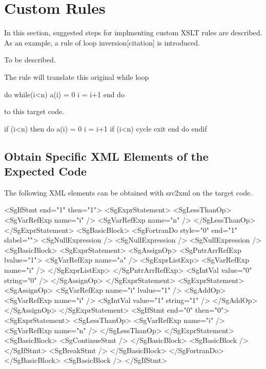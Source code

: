 \section{Custom Rules}\label{sec:custom}

In this section, suggested steps for implmenting custom XSLT rules are described.
As an example, a rule of loop inversion[citation] is introduced.

To be described.

\iffalse

The rule will translate this original while loop
\begin{framed}
\begin{src}
    do while(i<n)
        a(i) = 0
        i = i+1
    end do
\end{src}
\end{framed}

to this target code.

\begin{framed}
\begin{src}
    if (i<n) then
        do
            a(i) = 0
            i = i+1
            if  (i<n)  cycle
            exit
        end do
    endif
\end{src}
\end{framed}



\subsection{Obtain Specific XML Elements of the Expected Code}

The following XML elements can be obtained with src2xml on the target code.

\begin{framed}
\begin{src}
<SgIfStmt end="1" then="1">
	<SgExprStatement>
		<SgLessThanOp>
			<SgVarRefExp name="i" />
			<SgVarRefExp name="n" />
		</SgLessThanOp>
	</SgExprStatement>
	<SgBasicBlock>
		<SgFortranDo style="0" end="1" slabel="">
			<SgNullExpression />
			<SgNullExpression />
			<SgNullExpression />
			<SgBasicBlock>
				<SgExprStatement>
					<SgAssignOp>
						<SgPntrArrRefExp lvalue="1">
							<SgVarRefExp name="a" />
							<SgExprListExp>
								<SgVarRefExp name="i" />
							</SgExprListExp>
						</SgPntrArrRefExp>
						<SgIntVal value="0" string="0" />
					</SgAssignOp>
				</SgExprStatement>
				<SgExprStatement>
					<SgAssignOp>
						<SgVarRefExp name="i" lvalue="1" />
						<SgAddOp>
							<SgVarRefExp name="i" />
							<SgIntVal value="1" string="1" />
						</SgAddOp>
					</SgAssignOp>
				</SgExprStatement>
				<SgIfStmt end="0" then="0">
					<SgExprStatement>
						<SgLessThanOp>
							<SgVarRefExp name="i" />
							<SgVarRefExp name="n" />
						</SgLessThanOp>
					</SgExprStatement>
					<SgBasicBlock>
						<SgContinueStmt />
					</SgBasicBlock>
					<SgBasicBlock />
				</SgIfStmt>
				<SgBreakStmt />
			</SgBasicBlock>
		</SgFortranDo>
	</SgBasicBlock>
	<SgBasicBlock />
</SgIfStmt>
\end{src}
\end{framed}

